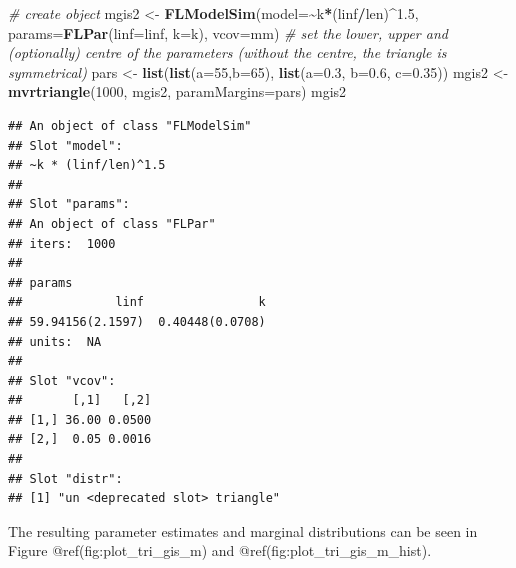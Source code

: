 \documentclass[
]{book}
\newenvironment{Shaded}{\begin{snugshade}}{\end{snugshade}}
\newcommand{\AttributeTok}[1]{\textcolor[rgb]{0.13,0.29,0.53}{#1}}
\newcommand{\CommentTok}[1]{\textcolor[rgb]{0.56,0.35,0.01}{\textit{#1}}}
\newcommand{\DecValTok}[1]{\textcolor[rgb]{0.00,0.00,0.81}{#1}}
\newcommand{\FloatTok}[1]{\textcolor[rgb]{0.00,0.00,0.81}{#1}}
\newcommand{\FunctionTok}[1]{\textcolor[rgb]{0.13,0.29,0.53}{\textbf{#1}}}
\newcommand{\NormalTok}[1]{#1}
\newcommand{\OtherTok}[1]{\textcolor[rgb]{0.56,0.35,0.01}{#1}}
\newcommand{\SpecialCharTok}[1]{\textcolor[rgb]{0.81,0.36,0.00}{\textbf{#1}}}
\begin{document}
\begin{Shaded}
\begin{Highlighting}[]
\CommentTok{\# create object}
\NormalTok{mgis2 }\OtherTok{\textless{}{-}} \FunctionTok{FLModelSim}\NormalTok{(}\AttributeTok{model=}\SpecialCharTok{\textasciitilde{}}\NormalTok{k}\SpecialCharTok{*}\NormalTok{(linf}\SpecialCharTok{/}\NormalTok{len)}\SpecialCharTok{\^{}}\FloatTok{1.5}\NormalTok{, }\AttributeTok{params=}\FunctionTok{FLPar}\NormalTok{(}\AttributeTok{linf=}\NormalTok{linf, }\AttributeTok{k=}\NormalTok{k), }\AttributeTok{vcov=}\NormalTok{mm)}
\CommentTok{\# set the lower, upper and (optionally) centre of the parameters (without the centre, the triangle is symmetrical)}
\NormalTok{pars }\OtherTok{\textless{}{-}} \FunctionTok{list}\NormalTok{(}\FunctionTok{list}\NormalTok{(}\AttributeTok{a=}\DecValTok{55}\NormalTok{,}\AttributeTok{b=}\DecValTok{65}\NormalTok{), }\FunctionTok{list}\NormalTok{(}\AttributeTok{a=}\FloatTok{0.3}\NormalTok{, }\AttributeTok{b=}\FloatTok{0.6}\NormalTok{, }\AttributeTok{c=}\FloatTok{0.35}\NormalTok{))}
\NormalTok{mgis2 }\OtherTok{\textless{}{-}} \FunctionTok{mvrtriangle}\NormalTok{(}\DecValTok{1000}\NormalTok{, mgis2, }\AttributeTok{paramMargins=}\NormalTok{pars)}
\NormalTok{mgis2}
\end{Highlighting}
\end{Shaded}

\begin{verbatim}
## An object of class "FLModelSim"
## Slot "model":
## ~k * (linf/len)^1.5
## 
## Slot "params":
## An object of class "FLPar"
## iters:  1000 
## 
## params
##             linf                k 
## 59.94156(2.1597)  0.40448(0.0708) 
## units:  NA 
## 
## Slot "vcov":
##       [,1]   [,2]
## [1,] 36.00 0.0500
## [2,]  0.05 0.0016
## 
## Slot "distr":
## [1] "un <deprecated slot> triangle"
\end{verbatim}

The resulting parameter estimates and marginal distributions can be seen in Figure @ref(fig:plot\_tri\_gis\_m) and @ref(fig:plot\_tri\_gis\_m\_hist).
\end{document}
